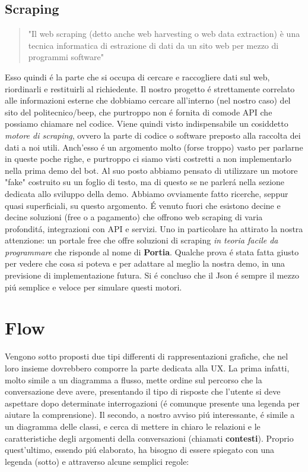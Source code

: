 \documentclass[]{article}
\begin{document}
\subsection{Scraping}
\begin{quote} 
"Il web scraping (detto anche web harvesting o web data extraction) è una tecnica informatica di estrazione di dati da un sito web per mezzo di programmi software"
\end{quote}
Esso quindi é la parte che si occupa di cercare e raccogliere dati sul web, riordinarli e restituirli al richiedente. Il nostro progetto é strettamente correlato alle informazioni esterne che dobbiamo cercare all'interno (nel nostro caso) del sito del politecnico/beep, che purtroppo non é fornita di comode API che possiamo chiamare nel codice. Viene quindi visto indispensabile un cosiddetto \textit{motore di scraping}, ovvero la parte di codice o software preposto alla raccolta dei dati a noi utili. Anch'esso é un argomento molto (forse troppo) vasto per parlarne in queste poche righe, e purtroppo ci siamo visti costretti a non implementarlo nella prima demo del bot. Al suo posto abbiamo pensato di utilizzare un motore "fake" costruito su un foglio di testo, ma di questo se ne parlerá nella sezione dedicata allo sviluppo della demo. Abbiamo ovviamente fatto ricerche, seppur quasi superficiali, su questo argomento. É venuto fuori che esistono decine e decine soluzioni (free o a pagamento) che offrono web scraping di varia profonditá, integrazioni con API e servizi. Uno in particolare ha attirato la nostra attenzione: un portale free che offre soluzioni di scraping \textit{in teoria facile da programmare} che risponde al nome di \textbf{Portia}. Qualche prova é stata fatta giusto per vedere che cosa si poteva e per adattare al meglio la nostra demo, in una previsione di implementazione futura. Si é concluso che il Json é sempre il mezzo piú semplice e veloce per simulare questi motori.

\section{Flow}
Vengono sotto proposti due tipi differenti di rappresentazioni grafiche, che nel loro insieme dovrebbero comporre la parte dedicata alla UX. La prima infatti, molto simile a un diagramma a flusso, mette ordine sul percorso che la conversazione deve avere, presentando il tipo di risposte che l'utente si deve aspettare dopo determinate interrogazioni (é comunque presente una legenda per aiutare la comprensione). Il secondo, a nostro avviso piú interessante, é simile a un diagramma delle classi, e cerca di mettere in chiaro le relazioni e le caratteristiche degli argomenti della conversazioni (chiamati \textbf{contesti}). Proprio quest'ultimo, essendo piú elaborato, ha bisogno di essere spiegato con una legenda (sotto) e attraverso alcune semplici regole:
\end{document}
